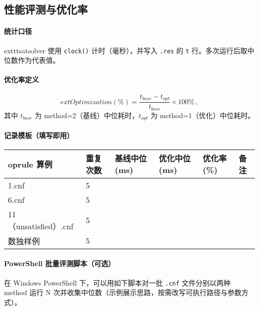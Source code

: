 \documentclass[UTF8]{ctexart}
\begin{document}
\subsection{性能评测与优化率}
\paragraph{统计口径}
	exttt{satsolver} 使用 \texttt{clock()} 计时（毫秒），并写入 \texttt{.res} 的 \texttt{t} 行。多次运行后取中位数作为代表值。

\paragraph{优化率定义}
\[
  	ext{Optimization}(\%) = \frac{t_{base} - t_{opt}}{t_{base}} \times 100\% \, ,
\]
其中 \(t_{base}\) 为 method=2（基线）中位耗时，\(t_{opt}\) 为 method=1（优化）中位耗时。

\paragraph{记录模板（填写即用）}
\begin{longtable}{p{3.2cm}p{2.2cm}p{2.2cm}p{2.2cm}p{2.2cm}p{2.2cm}}
	oprule
算例 & 重复次数 & 基线中位(ms) & 优化中位(ms) & 优化率(\%) & 备注 \\
\midrule
1.cnf & 5 &  &  &  &  \\
6.cnf & 5 &  &  &  &  \\
11（unsatisfied）.cnf & 5 &  &  &  &  \\
数独样例 & 5 &  &  &  &  \\
\bottomrule
\end{longtable}

\paragraph{PowerShell 批量评测脚本（可选）}
在 Windows PowerShell 下，可以用如下脚本对一批 \texttt{.cnf} 文件分别以两种 method 运行 N 次并收集中位数（示例展示思路，按需改写可执行路径与参数方式）。
\end{document}
